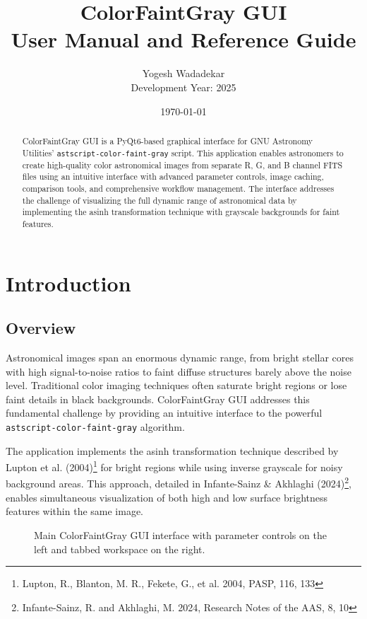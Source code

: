 \documentclass[11pt,a4paper]{article}
\title{\textbf{ColorFaintGray GUI}\\
\large{User Manual and Reference Guide}}
\author{Yogesh Wadadekar\\
\small{Development Year: 2025}}
\date{\today}
\begin{document}
\maketitle

\begin{abstract}
ColorFaintGray GUI is a PyQt6-based graphical interface for GNU Astronomy
Utilities' \texttt{astscript-color-faint-gray} script. This application
enables astronomers to create high-quality color astronomical images from
separate R, G, and B channel FITS files using an intuitive interface with
advanced parameter controls, image caching, comparison tools, and
comprehensive workflow management. The interface addresses the challenge of
visualizing the full dynamic range of astronomical data by implementing the
asinh transformation technique with grayscale backgrounds for faint
features.
\end{abstract}

\tableofcontents
\newpage

\section{Introduction}

\subsection{Overview}

Astronomical images span an enormous dynamic range, from bright stellar cores
with high signal-to-noise ratios to faint diffuse structures barely above
the noise level. Traditional color imaging techniques often saturate bright
regions or lose faint details in black backgrounds. ColorFaintGray GUI
addresses this fundamental challenge by providing an intuitive interface to
the powerful \texttt{astscript-color-faint-gray} algorithm.

The application implements the asinh transformation technique described by
Lupton et al. (2004)\footnote{Lupton, R., Blanton, M. R., Fekete, G., et
al. 2004, PASP, 116, 133} for bright regions while using inverse grayscale
for noisy background areas. This approach, detailed in Infante-Sainz \&
Akhlaghi (2024)\footnote{Infante-Sainz, R. and Akhlaghi, M. 2024, Research
Notes of the AAS, 8, 10}, enables simultaneous visualization of both high
and low surface brightness features within the same image.

\begin{figure}[H]
\centering
\caption{Main ColorFaintGray GUI interface with parameter controls on the
left and tabbed workspace on the right.}
\label{fig:main-interface}
\end{figure}
\end{document}

